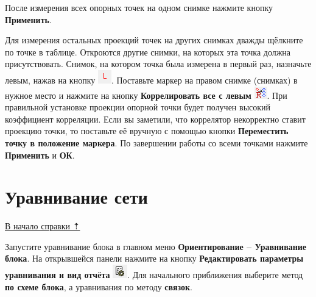 \documentclass[
  12pt,
]{book}
\begin{document}
После измерения всех опорных точек на одном снимке нажмите кнопку \textbf{Применить}.

Для измерения остальных проекций точек на других снимках дважды щёлкните по точке в таблице. Откроются другие снимки, на которых эта точка должна присутствовать. Снимок, на котором точка была измерена в первый раз, назначьте левым, нажав на кнопку \includegraphics{images/Ref15/Make_Left.png}. Поставьте маркер на правом снимке (снимках) в нужное место и нажмите на кнопку \textbf{Коррелировать все с левым} \includegraphics{images/Ref15/Correlate.png}. При правильной установке проекции опорной точки будет получен высокий коэффициент корреляции. Если вы заметили, что коррелятор некорректно ставит проекцию точки, то поставьте её вручную с помощью кнопки \textbf{Переместить точку в положение маркера}. По завершении работы со всеми точками нажмите \textbf{Применить} и \textbf{ОК}.

\hypertarget{photomod-network_adjustment}{%
\section{Уравнивание сети}\label{photomod-network_adjustment}}

\protect\hyperlink{photomod}{В начало справки ⇡}

Запустите уравнивание блока в главном меню \textbf{Ориентирование -- Уравнивание блока}. На открывшейся панели нажмите на кнопку \textbf{Редактировать параметры уравнивания и вид отчёта} \includegraphics{images/Ref15/Adjustment.png}. Для начального приближения выберите метод \textbf{по схеме блока}, а уравнивания по методу \textbf{связок}.
\end{document}
